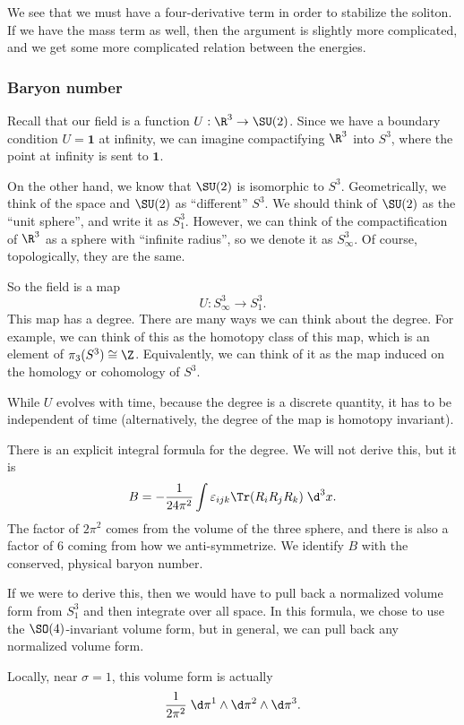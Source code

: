 \documentclass[a4paper]{article}
\begin{document}
We see that we must have a four-derivative term in order to stabilize the soliton. If we have the mass term as well, then the argument is slightly more complicated, and we get some more complicated relation between the energies.


\subsubsection*{Baryon number}
Recall that our field is a function $U: \R^3 \to \SU(2)$. Since we have a boundary condition $U = \mathbf{1}$ at infinity, we can imagine compactifying $\R^3$ into $S^3$, where the point at infinity is sent to $\mathbf{1}$.

On the other hand, we know that $\SU(2)$ is isomorphic to $S^3$. Geometrically, we think of the space and $\SU(2)$ as ``different'' $S^3$. We should think of $\SU(2)$ as the ``unit sphere'', and write it as $S^3_1$. However, we can think of the compactification of $\R^3$ as a sphere with ``infinite radius'', so we denote it as $S^3_\infty$. Of course, topologically, they are the same.

So the field is a map
\[
  U: S^3_\infty \to S^3_1.
\]
This map has a degree. There are many ways we can think about the degree. For example, we can think of this as the homotopy class of this map, which is an element of $\pi_3(S^3) \cong \Z$. Equivalently, we can think of it as the map induced on the homology or cohomology of $S^3$.

While $U$ evolves with time, because the degree is a discrete quantity, it has to be independent of time (alternatively, the degree of the map is homotopy invariant).

There is an explicit integral formula for the degree. We will not derive this, but it is
\[
  B = - \frac{1}{24\pi^2} \int \varepsilon_{ijk} \Tr(R_i R_j R_k) \;\d^3 x.
\]
The factor of $2\pi^2$ comes from the volume of the three sphere, and there is also a factor of $6$ coming from how we anti-symmetrize. We identify $B$ with the conserved, physical baryon number.

If we were to derive this, then we would have to pull back a normalized volume form from $S_1^3$ and then integrate over all space. In this formula, we chose to use the $\SO(4)$-invariant volume form, but in general, we can pull back any normalized volume form.

Locally, near $\sigma = 1$, this volume form is actually
\[
  \frac{1}{2\pi^2}\;\d \pi^1 \wedge\d \pi^2 \wedge\d \pi^3.
\]
\end{document}
